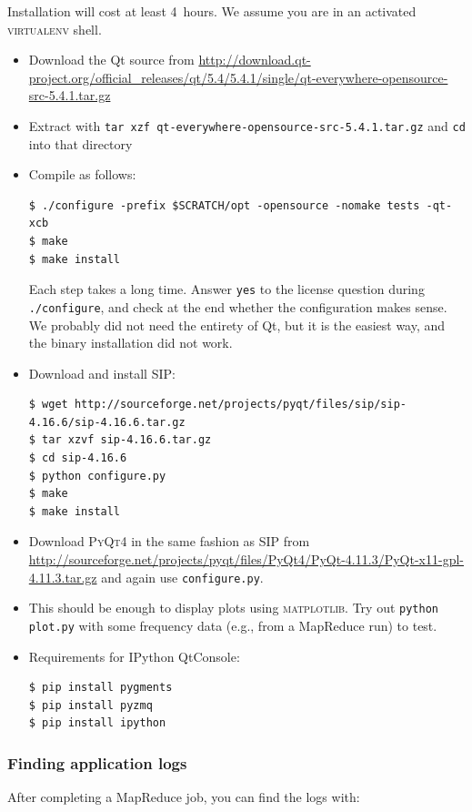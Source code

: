 \documentclass{article}
\begin{document}
Installation will cost at least 4~hours. We assume you are in an activated 
\textsc{virtualenv} shell.

\begin{itemize}
  \item Download the Qt source from 
    \url{http://download.qt-project.org/official_releases/qt/5.4/5.4.1/single/qt-everywhere-opensource-src-5.4.1.tar.gz}
  \item Extract with \texttt{tar xzf qt-everywhere-opensource-src-5.4.1.tar.gz} 
    and \texttt{cd} into that directory
  \item Compile as follows:

\begin{verbatim}
$ ./configure -prefix $SCRATCH/opt -opensource -nomake tests -qt-xcb
$ make
$ make install
\end{verbatim}

    Each step takes a long time. Answer \texttt{yes} to the license question 
    during \texttt{./configure}, and check at the end whether the configuration 
    makes sense. We probably did not need the entirety of Qt, but it is the 
    easiest way, and the binary installation did not work.
  \item Download and install \textsc{SIP}:

\begin{verbatim}
$ wget http://sourceforge.net/projects/pyqt/files/sip/sip-4.16.6/sip-4.16.6.tar.gz
$ tar xzvf sip-4.16.6.tar.gz
$ cd sip-4.16.6
$ python configure.py
$ make
$ make install
\end{verbatim}

  \item Download \textsc{PyQt4} in the same fashion as \textsc{SIP} from 
    \url{http://sourceforge.net/projects/pyqt/files/PyQt4/PyQt-4.11.3/PyQt-x11-gpl-4.11.3.tar.gz} 
    and again use \texttt{configure.py}.
  \item This should be enough to display plots using \textsc{matplotlib}. Try 
    out \texttt{python plot.py} with some frequency data (e.g., from 
    a MapReduce run) to test.
  \item Requirements for IPython QtConsole:

\begin{verbatim}
$ pip install pygments
$ pip install pyzmq
$ pip install ipython
\end{verbatim}
\end{itemize}

\subsubsection{Finding application logs}\label{app:finding-application-logs}
After completing a MapReduce job, you can find the logs with:
\end{document}

